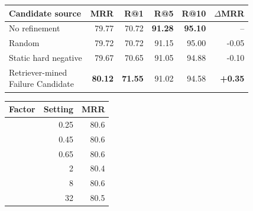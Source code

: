 \documentclass[11pt]{article}
\begin{document}
\begin{table}[!t]
  \begin{minipage}[t]{0.485\textwidth}
    \centering
    \captionsetup{skip=2pt}
    \footnotesize
    \setlength{\tabcolsep}{3.0pt}
    \begin{tabular}{@{}lrrrrr@{}}
      \toprule
      Candidate source & MRR & R@1 & R@5 & R@10 & \(\Delta\)MRR \\
      \midrule
      No refinement & 79.77 & 70.72 & \textbf{91.28} & \textbf{95.10} & -- \\
      Random & 79.72 & 70.72 & 91.15 & 95.00 & -0.05 \\
      Static hard negative & 79.67 & 70.65 & 91.05 & 94.88 & -0.10 \\
      \shortstack[l]{Retriever-mined\\Failure Candidate} & \textbf{80.12} & \textbf{71.55} & 91.02 & 94.58 & \textbf{+0.35} \\
      \bottomrule
    \end{tabular}
    \label{tab:candidate_controls}
  \end{minipage}
  \hfill
  \begin{minipage}[t]{0.485\textwidth}
    \centering
    \captionsetup{skip=2pt}
    \footnotesize
    \renewcommand{\arraystretch}{0.95}
    \begin{tabular*}{\linewidth}{@{\extracolsep{\fill}}lrr@{}}
      \toprule
      Factor & Setting & MRR \\
      \midrule
       & 0.25 & 80.6 \\
       & 0.45 & 80.6 \\
       & 0.65 & 80.6 \\
      \midrule
       & 2 & 80.4 \\
       & 8 & 80.6 \\
       & 32 & 80.5 \\
      \bottomrule
    \end{tabular*}
    \label{tab:training_sensitivity}
  \end{minipage}
\end{table}
\end{document}
